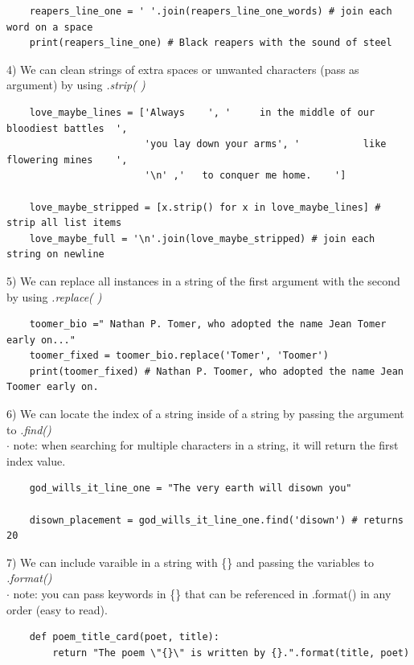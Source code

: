 \documentclass[11pt, a4paper]{article}
\begin{document}
\begin{spacing}{1.1}
\begin{lstlisting}
	reapers_line_one = ' '.join(reapers_line_one_words) # join each word on a space
	print(reapers_line_one) # Black reapers with the sound of steel	\end{lstlisting}\vspace*{1mm}
	\hspace*{1.5mm} 4) We can clean strings of extra spaces or unwanted characters (pass as argument) by using \textit{.strip( )}  
	\begin{lstlisting}
	love_maybe_lines = ['Always    ', '     in the middle of our bloodiest battles  ', 
	                    'you lay down your arms', '           like flowering mines    ',
	                    '\n' ,'   to conquer me home.    ']
	
	love_maybe_stripped = [x.strip() for x in love_maybe_lines] # strip all list items
	love_maybe_full = '\n'.join(love_maybe_stripped) # join each string on newline \end{lstlisting} \newpage
	\noindent \hspace*{1.5mm} 5) We can replace all instances in a string of the first argument with the second by using \textit{.replace( )}
	\begin{lstlisting}
	toomer_bio =" Nathan P. Tomer, who adopted the name Jean Tomer early on..."
	toomer_fixed = toomer_bio.replace('Tomer', 'Toomer')
	print(toomer_fixed) # Nathan P. Toomer, who adopted the name Jean Toomer early on.	\end{lstlisting}\vspace*{1mm}
	\hspace*{1.5mm} 6) We can locate the index of a string inside of a string by passing the argument to \textit{.find()} \\
	\hspace*{6mm} $\cdot$ note: when searching for multiple characters in a string, it will return the first index value.
	\begin{lstlisting}
	god_wills_it_line_one = "The very earth will disown you"
	
	disown_placement = god_wills_it_line_one.find('disown') # returns 20 \end{lstlisting}\vspace*{1mm}
	\hspace*{1.5mm} 7) We can include varaible in a string with \{\} and passing the variables to \textit{.format()} \\
	\hspace*{6mm} $\cdot$ note: you can pass keywords in \{\} that can be referenced in .format() in any order (easy to read).
	\begin{lstlisting}
	def poem_title_card(poet, title):
		return "The poem \"{}\" is written by {}.".format(title, poet)
	

\end{lstlisting}
\end{spacing}
\end{document}

